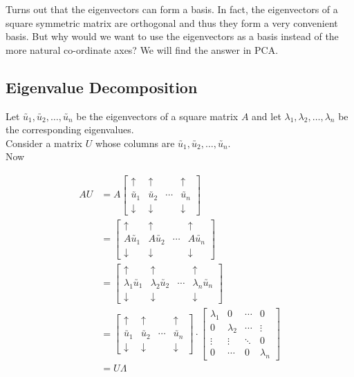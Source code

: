 \documentclass[11pt, a4paper]{article}
\begin{document}
\leftpointright \hspace{0.3cm} Turns out that the eigenvectors can form a basis. In fact, the eigenvectors of a square symmetric matrix are orthogonal and thus they form a very convenient basis. But why would we want to use the eigenvectors as a basis instead of the more natural co-ordinate axes? We will find the answer in PCA. \\

\subsection{Eigenvalue Decomposition}

Let $\utilde{u_1}, \utilde{u_2}, \ldots, \utilde{u_n}$ be the eigenvectors of a square matrix $A$ and let $\lambda_1, \lambda_2, \ldots, \lambda_n$ be the corresponding eigenvalues. \\[1.5em]

Consider a matrix $U$ whose columns are $\utilde{u_1}, \utilde{u_2}, \ldots, \utilde{u_n}$. \\[1.5em]

Now

\begin{align*}
AU &= A \begin{bmatrix}
\uparrow & \uparrow & & \uparrow \\
\utilde{u_1} & \utilde{u_2} & \cdots & \utilde{u_n} \\
\downarrow & \downarrow & & \downarrow
\end{bmatrix} \\[1.5em]
&= \begin{bmatrix}
\uparrow & \uparrow & & \uparrow \\
A\utilde{u_1} & A\utilde{u_2} & \cdots & A\utilde{u_n} \\
\downarrow & \downarrow & & \downarrow
\end{bmatrix} \\[1.5em]
&= \begin{bmatrix}
\uparrow & \uparrow & & \uparrow \\
\lambda_1 \utilde{u_1} & \lambda_2 \utilde{u_2} & \cdots & \lambda_n \utilde{u_n} \\
\downarrow & \downarrow & & \downarrow
\end{bmatrix} \\[1.5em]
&= \begin{bmatrix}
\uparrow & \uparrow & & \uparrow \\
\utilde{u_1} & \utilde{u_2} & \cdots & \utilde{u_n} \\
\downarrow & \downarrow & & \downarrow
\end{bmatrix} \cdot
\begin{bmatrix}
\lambda_1 & 0 & \cdots & 0 \\
0 & \lambda_2 & \cdots & \vdots \\
\vdots & \vdots & \ddots & 0 \\
0 & \cdots & 0 & \lambda_n
\end{bmatrix} \\[1.5em]
&= U \Lambda
\end{align*}
\end{document}
